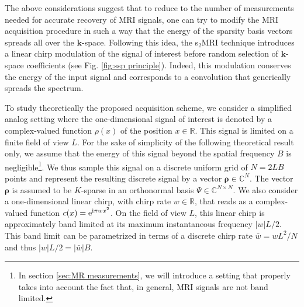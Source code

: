 \documentclass[10pt,draftcls, onecolumn]{IEEEtran}
\begin{document}
The above considerations suggest that to reduce to the number of measurements needed for accurate recovery of MRI signals, one can try to modify the MRI acquisition procedure in such a way that the energy of the sparsity basis vectors spreads all over the $\bm{k}$-space. Following this idea, the s$_2$MRI technique introduces a linear chirp modulation of the signal of interest before random selection of $\bm{k}$-space coefficients (see Fig. \ref{fig:ssp principle}). Indeed, this modulation conserves the energy of the input signal and corresponds to a convolution that generically spreads the spectrum. 

To study theoretically the proposed acquisition scheme, we consider a simplified analog setting where the one-dimensional signal of interest is denoted by a complex-valued function $\rho(x)$ of the position $x \in \mathbb{R}$. This signal is limited on a finite field of view $L$. For the sake of simplicity of the following theoretical result only, we assume that the energy of this signal beyond the spatial frequency $B$ is negligible\footnote{In section \ref{sec:MR measurements}, we will introduce a setting that properly takes into account the fact that, in general, MRI signals are not band limited.}. We thus sample this signal on a discrete uniform grid of $N = 2LB$ points and represent the resulting discrete signal by a vector $\bm{\rho} \in \mathbb{C}^N$. The vector $\bm{\rho}$ is assumed to be $K$-sparse in an orthonormal basis $\mathsf{\Psi} \in \mathbb{C}^{N \times N}$. We also consider a one-dimensional linear chirp, with chirp rate $w \in \mathbb{R}$, that reads as a complex-valued function $c(x) = {\rm e}^{ {\rm i} \pi w x^2 }$. On the field of view $L$, this linear chirp is approximately band limited at its maximum instantaneous frequency $\vert w \vert L/2$. This band limit can be parametrized in terms of a discrete chirp rate $\bar{w} = w L^2/N$ and thus $\vert w \vert L/2 = \vert \bar{w} \vert B$. 
\end{document}

